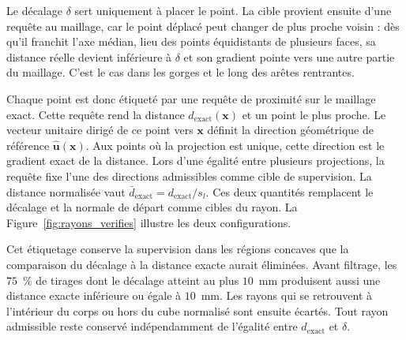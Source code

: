 Le décalage $\delta$ sert uniquement à placer le point. La cible provient ensuite d'une requête au maillage, car le point déplacé peut changer de plus proche voisin : dès qu'il franchit l'axe médian, lieu des points équidistants de plusieurs faces, sa distance réelle devient inférieure à $\delta$ et son gradient pointe vers une autre partie du maillage. C'est le cas dans les gorges et le long des arêtes rentrantes.

Chaque point est donc étiqueté par une requête de proximité sur le maillage exact. Cette requête rend la distance $d_{\text{exact}}(\mathbf{x})$ et un point le plus proche. Le vecteur unitaire dirigé de ce point vers $\mathbf{x}$ définit la direction géométrique de référence $\hat{\mathbf{u}}(\mathbf{x})$. Aux points où la projection est unique, cette direction est le gradient exact de la distance. Lors d'une égalité entre plusieurs projections, la requête fixe l'une des directions admissibles comme cible de supervision. La distance normalisée vaut $\bar d_{\text{exact}}=d_{\text{exact}}/s_l$. Ces deux quantités remplacent le décalage et la normale de départ comme cibles du rayon. La Figure~\ref{fig:rayons_verifies} illustre les deux configurations.

Cet étiquetage conserve la supervision dans les régions concaves que la comparaison du décalage à la distance exacte aurait éliminées. Avant filtrage, les $75$~\% de tirages dont le décalage atteint au plus $10$~mm produisent aussi une distance exacte inférieure ou égale à $10$~mm. Les rayons qui se retrouvent à l'intérieur du corps ou hors du cube normalisé sont ensuite écartés. Tout rayon admissible reste conservé indépendamment de l'égalité entre $d_{\text{exact}}$ et $\delta$.

